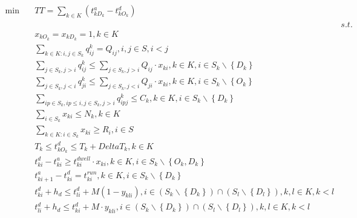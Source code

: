 \begin{align}
  \min\quad & \mathit{TT} = \sum_{k \in K} \left(t_{k D_{k}}^{a} - t_{k O_{k}}^{d}\right) \tag{eq\_0001} \\
  &  & s . t . \\ & x_{k O_{k}} = x_{k D_{k}} = 1 , k \in K  \tag{eq\_0002} \\
  & \sum_{k \in K : i , j \in S_{k}} q_{i j}^{k} = Q_{i j} , i , j \in S , i < j \tag{eq\_0003} \\
  & \sum_{j \in S_{k} , j > i} q_{\mathit{ij}}^{k} \leq \sum_{j \in S_{k} , j > i} Q_{\mathit{ij}} \cdot x_{\mathit{ki}} , k \in K , i \in S_{k} \backslash \left\{D_{k}\right\} \tag{eq\_0004} \\
  & \sum_{j \in S_{k} , j < i} q_{\mathit{ji}}^{k} \leq \sum_{j \in S_{k} , j < i} Q_{\mathit{ji}} \cdot x_{\mathit{ki}} , k \in K , i \in S_{k} \backslash \left\{O_{k}\right\} \tag{eq\_0005} \\
  & \sum_{ip \in S_{k} , ip \leq i, j \in S_{k} , j > i} q_{ip j}^{k} \leq C_{k} , k \in K , i \in S_{k} \backslash \left\{D_{k}\right\} \tag{eq\_0006} \\
  & \sum_{i \in S_{k}} x_{k i} \leq N_{k} , k \in K \tag{eq\_0007} \\
  & \sum_{k \in K : i \in S_{k}} x_{k i} \geq R_{i} , i \in S \tag{eq\_0008} \\
  & T_{k} \leq t_{k O_{k}}^{d} \leq T_{k} + \mathit{Delta} T_{k} , k \in K \tag{eq\_0009} \\
  & t_{k i}^{d} - t_{k i}^{a} \geq t_{k i}^{d w e l l} \cdot x_{k i} , k \in K , i \in S_{k} \backslash \left\{O_{k} , D_{k}\right\} \tag{eq\_0010} \\
  & t_{k i + 1}^{a} - t_{k i}^{d} = t_{k i}^{r u n} , k \in K , i \in S_{k} \backslash \left\{D_{k}\right\} \tag{eq\_0011} \\
  & t_{k i}^{d} + h_{d} \leq t_{l i}^{d} + M \left(1 - y_{k l i}\right) , i \in \left(S_{k} \backslash \left\{D_{k}\right\}\right) \cap \left(S_{l} \backslash \left\{D_{l}\right\}\right) , k , l \in K , k < l \tag{eq\_0012} \\
  & t_{l i}^{d} + h_{d} \leq t_{k i}^{d} + M \cdot y_{k l i} , i \in \left(S_{k} \backslash \left\{D_{k}\right\}\right) \cap \left(S_{l} \backslash \left\{D_{l}\right\}\right) , k , l \in K , k < l \tag{eq\_0013} \\

\end{align}
